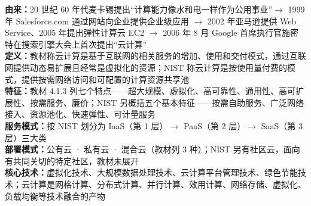 \documentclass[a4paper,11pt]{article}
\begin{document}

\begin{knowmap}
\textbf{由来：}20 世纪 60 年代麦卡锡提出“计算能力像水和电一样作为公用事业”$\rightarrow$ 1999 年 Salesforce.com 通过网站向企业提供企业级应用 $\rightarrow$ 2002 年亚马逊提供 Web Service、2005 年提出弹性计算云 EC2 $\rightarrow$ 2006 年 8 月 Google 首席执行官施密特在搜索引擎大会上首次提出“云计算”\\[2pt]
\textbf{定义：}教材称云计算是基于互联网的相关服务的增加、使用和交付模式，通过互联网提供动态易扩展且经常是虚拟化的资源；NIST 称云计算是按使用量付费的模式，提供按需网络访问和可配置的计算资源共享池\\[2pt]
\textbf{特征：}教材 4.1.3 列七个特点——超大规模、虚拟化、高可靠性、通用性、高可扩展性、按需服务、廉价；NIST 另概括五个基本特征——按需自助服务、广泛网络接入、资源池化、快速弹性、可计量服务\\[2pt]
\textbf{服务模式：}按 NIST 划分为 IaaS（第 1 层）$\rightarrow$ PaaS（第 2 层）$\rightarrow$ SaaS（第 3 层）三大类\\[2pt]
\textbf{部署模式：}公有云 · 私有云 · 混合云（教材列 3 种）；NIST 另有社区云，面向有共同关切的特定社区，教材未展开\\[2pt]
\textbf{核心技术：}虚拟化技术、大规模数据处理技术、云计算平台管理技术、绿色节能技术；云计算是网格计算、分布式计算、并行计算、效用计算、网络存储、虚拟化、负载均衡等技术融合的产物
\end{knowmap}
\end{document}
